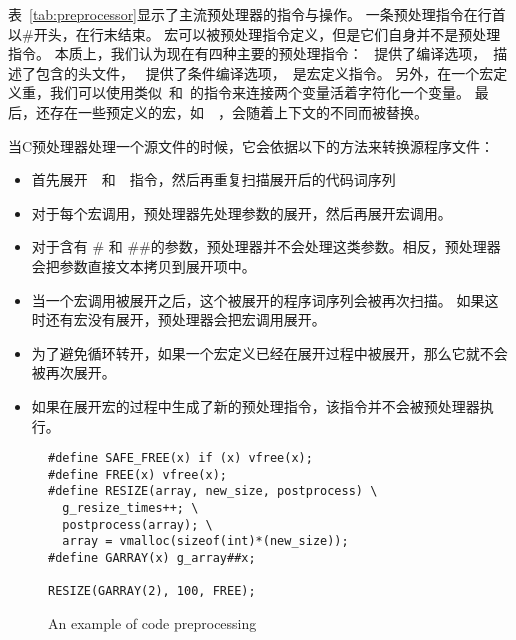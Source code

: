 表~\ref{tab:preprocessor}显示了主流预处理器的指令与操作。
一条预处理指令在行首以\#开头，在行末结束。
宏可以被预处理指令定义，但是它们自身并不是预处理指令。
本质上，我们认为现在有四种主要的预处理指令：
~提供了编译选项，~描述了包含的头文件，
~提供了条件编译选项，~是宏定义指令。
另外，在一个宏定义重，我们可以使用类似\code{\#\#}~和\code{\#}~的指令来连接两个变量活着字符化一个变量。
最后，还存在一些预定义的宏，如~~，会随着上下文的不同而被替换。

当C预处理器处理一个源文件的时候，它会依据以下的方法来转换源程序文件：
\begin{itemize}
\item 首先展开~~和~~指令，然后再重复扫描展开后的代码词序列
\item 对于每个宏调用，预处理器先处理参数的展开，然后再展开宏调用。
\item 对于含有 \# 和 \#\#的参数，预处理器并不会处理这类参数。相反，预处理器会把参数直接文本拷贝到展开项中。
\item 当一个宏调用被展开之后，这个被展开的程序词序列会被再次扫描。
      如果这时还有宏没有展开，预处理器会把宏调用展开。
\item 为了避免循环转开，如果一个宏定义已经在展开过程中被展开，那么它就不会被再次展开。
\item 如果在展开宏的过程中生成了新的预处理指令，该指令并不会被预处理器执行。
\end{itemize}

\begin{figure}[ht]
  \centering
\begin{lstlisting}
#define SAFE_FREE(x) if (x) vfree(x);
#define FREE(x) vfree(x);
#define RESIZE(array, new_size, postprocess) \
  g_resize_times++; \
  postprocess(array); \
  array = vmalloc(sizeof(int)*(new_size));
#define GARRAY(x) g_array##x;

RESIZE(GARRAY(2), 100, FREE);
\end{lstlisting}
  \caption{An example of code preprocessing\label{fig:example} }
\end{figure}

